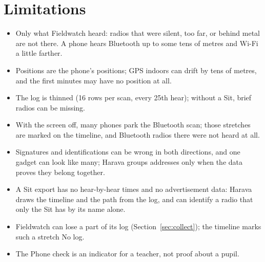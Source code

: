 \documentclass[10pt,a4paper]{article}
\newcommand{\ui}[1]{\textsf{\small #1}}            %
\begin{document}
\section{Limitations}\label{sec:limits}
\begin{itemize}[leftmargin=1.2em]
\item Only what Fieldwatch heard: radios that were silent, too far, or behind metal are not there. A phone hears Bluetooth up to some tens of metres and Wi-Fi a little farther.
\item Positions are the phone's positions; GPS indoors can drift by tens of metres, and the first minutes may have no position at all.
\item The log is thinned (16 rows per scan, every 25th hear); without a Sit, brief radios can be missing.
\item With the screen off, many phones park the Bluetooth scan; those stretches are marked on the timeline, and Bluetooth radios there were not heard at all.
\item Signatures and identifications can be wrong in both directions, and one gadget can look like many; Harava groups addresses only when the data proves they belong together.
\item A Sit export has no hear-by-hear times and no advertisement data: Harava draws the timeline and the path from the log, and can identify a radio that only the Sit has by its name alone.
\item Fieldwatch can lose a part of its log (Section~\ref{sec:collect}); the timeline marks such a stretch \ui{No log}.
\item The Phone check is an indicator for a teacher, not proof about a pupil.
\end{itemize}

\end{document}

